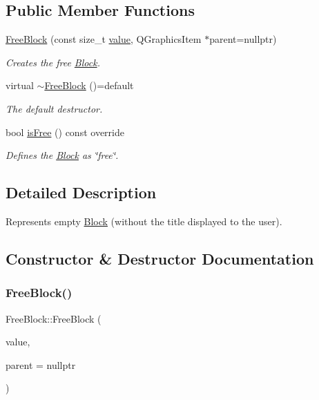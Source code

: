 \subsection*{Public Member Functions}
\begin{DoxyCompactItemize}
\item 
\mbox{\hyperlink{class_free_block_a6c7d3b6a2c8b1edac0f59ea2b33b9e73}{Free\+Block}} (const size\+\_\+t \mbox{\hyperlink{class_block_ab0b547f273f8d5e4e783ccedaf13ef26}{value}}, Q\+Graphics\+Item $\ast$parent=nullptr)
\begin{DoxyCompactList}\small\item\em Creates the free \mbox{\hyperlink{class_block}{Block}}. \end{DoxyCompactList}\item 
virtual \mbox{\hyperlink{class_free_block_a7bd1edc9b556e577949cb2ec97b4f817}{$\sim$\+Free\+Block}} ()=default
\begin{DoxyCompactList}\small\item\em The default destructor. \end{DoxyCompactList}\item 
bool \mbox{\hyperlink{class_free_block_a76d3f40934d42c566095ee2f1386eac5}{is\+Free}} () const override
\begin{DoxyCompactList}\small\item\em Defines the \mbox{\hyperlink{class_block}{Block}} as \char`\"{}free\char`\"{}. \end{DoxyCompactList}\end{DoxyCompactItemize}


\subsection{Detailed Description}
Represents empty \mbox{\hyperlink{class_block}{Block}} (without the title displayed to the user). 



\subsection{Constructor \& Destructor Documentation}
\mbox{\label{class_free_block_a6c7d3b6a2c8b1edac0f59ea2b33b9e73}} 
\subsubsection{\texorpdfstring{FreeBlock()}{FreeBlock()}}
{\footnotesize\ttfamily Free\+Block\+::\+Free\+Block (\begin{DoxyParamCaption}\item[{const size\+\_\+t}]{value,  }\item[{Q\+Graphics\+Item $\ast$}]{parent = {\ttfamily nullptr} }\end{DoxyParamCaption})\hspace{0.3cm}{\ttfamily [inline]}}



